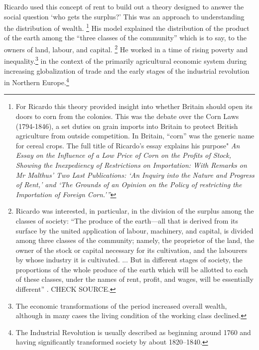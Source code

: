 Ricardo used this concept of rent to build out a theory designed to answer the social question `who gets the surplus?' This was an approach to understanding the distribution of wealth.%
 \footnote{For Ricardo this theory provided insight into whether Britain should open its doors to corn from the colonies. This was the debate over the Corn Laws (1794-1846), a set duties on grain imports into Britain to protect British agriculture from outside competition. In Britain, ``corn'' was the generic name for cereal crops. The full title of Ricardo's essay explains his purpose" \textit{An Essay on the Influence of a Low Price of Corn on the Profits of Stock, Showing the Inexpediency of Restrictions on Importation: With Remarks on Mr Malthus' Two Last Publications: `An Inquiry into the Nature and Progress of Rent,' and `The Grounds of an Opinion on the Policy of restricting the Importation of Foreign Corn.'''}} His model explained the distribution of the product of the earth among the ``three classes of the community'' which is to say, to the owners of land, labour, and capital.
\footnote{
Ricardo was interested, in particular, in the division of the surplus among the classes of society:  
 ``The produce of the earth---all that is derived from its surface by the united application of labour, machinery, and capital, is divided among three classes of the community; namely, the proprietor of the land, the owner of the stock or capital necessary for its cultivation, and the labourers by whose industry it is cultivated. ...  But in different stages of society, the proportions of the whole produce of the earth which will be allotted to each of these classes, under the names of rent, profit, and wages, will be essentially different''  \cite{ricardoEssayInfluenceLow1815}. CHECK SOURCE.
}
He worked in a time of rising poverty and inequality.\footnote{The economic transformations of the period increased overall wealth, although in many cases the living condition of the working class declined.} in the context of the primarily agricultural economic system during increasing globalization of trade and the early stages of the industrial revolution in Northern Europe.\footnote{The Industrial Revolution is usually described as beginning around 1760 and having significantly transformed society by about 1820--1840.} %

